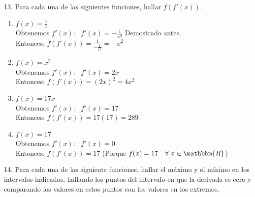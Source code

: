 \documentclass[12pt]{article}
\begin{document}
13. Para cada una de las siguientes funciones, hallar $f(f'(x))$.

\begin{enumerate}[\hspace{9px} a)]
    \item \(f(x)=\displaystyle\frac{1}{x}\)\\

        Obtenemos $f'(x)$: \ \(f'(x)=\displaystyle-\frac{1}{x^2}\) \qquad Demostrado antes.\\

        Entonces: \quad \(f(f'(x))=\displaystyle\frac{1}{\displaystyle-\frac{1}{x^2}}=-x^2\)

    \item \(f(x)=x^2\)\\

        Obtenemos $f'(x)$: \ \(f'(x)=2x\)\\

        Entonces: \quad \(f(f'(x))=(2x)^2=4x^2\)

    \item \(f(x)=17x\)\\

        Obtenemos $f'(x)$: \ \(f'(x)=17\)\\

        Entonces: \quad \(f(f'(x))=17(17)=289\)

    \item \(f(x)=17\)\\

        Obtenemos $f'(x)$: \ \(f'(x)=0\)\\

        Entonces: \quad \(f(f'(x))=17\) \qquad (Porque \(f(x)=17 \quad \forall \ x \in \mathbbm{R}\))\\

\end{enumerate}

14. Para cada una de las siguiente funciones, hallar el m\'aximo y el m\'inimo en los intervalos indicados, hallando los puntos del intervalo en que la derivada es cero y comparando los valores en estos puntos con los valores en los extremos.
\end{document}
